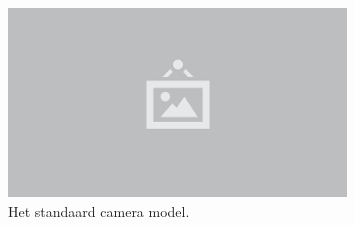 \begin{figure}
  \centering
  \includegraphics[width=0.8\textwidth]{./img/raw/placeholder.png}
  \caption{Het standaard camera model.}
  \label{fig:cm-camera}
\end{figure}
